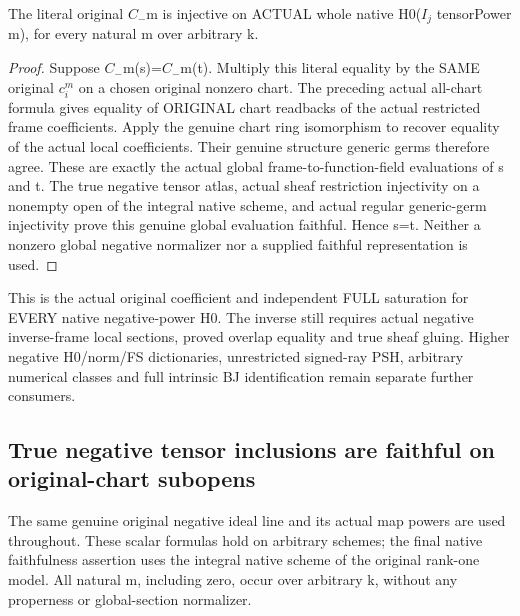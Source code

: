 \begin{lemma}
\label{lem:seven-native-negative-tensor-original-coefficient-faithful}
\leanok
The literal original $C_-$m is injective on ACTUAL whole native
H0($I_j$ tensorPower m), for every natural m over arbitrary k.
\end{lemma}
\begin{proof}
Suppose $C_-$m(s)=$C_-$m(t). Multiply this literal equality by the SAME
original $c_i^m$ on a chosen original nonzero chart. The preceding actual
all-chart formula gives equality of ORIGINAL chart readbacks of the
actual restricted frame coefficients. Apply the genuine chart ring
isomorphism to recover equality of the actual local coefficients.
Their genuine structure generic germs therefore agree. These are
exactly the actual global frame-to-function-field evaluations of s
and t. The true negative tensor atlas, actual sheaf restriction
injectivity on a nonempty open of the integral native scheme, and
actual regular generic-germ injectivity prove this genuine global
evaluation faithful. Hence s=t. Neither a nonzero global negative
normalizer nor a supplied faithful representation is used.
\end{proof}

This is the actual original coefficient and independent FULL saturation
for EVERY native negative-power H0. The inverse still requires actual
negative inverse-frame local sections, proved overlap equality and true
sheaf gluing. Higher negative H0/norm/FS dictionaries, unrestricted
signed-ray PSH, arbitrary numerical classes and full intrinsic BJ
identification remain separate further consumers.

\subsection{True negative tensor inclusions are faithful on original-chart subopens}
The same genuine original negative ideal line and its actual map powers
are used throughout. These scalar formulas hold on arbitrary schemes;
the final native faithfulness assertion uses the integral native scheme
of the original rank-one model. All natural m, including zero, occur
over arbitrary k, without any properness or global-section normalizer.


